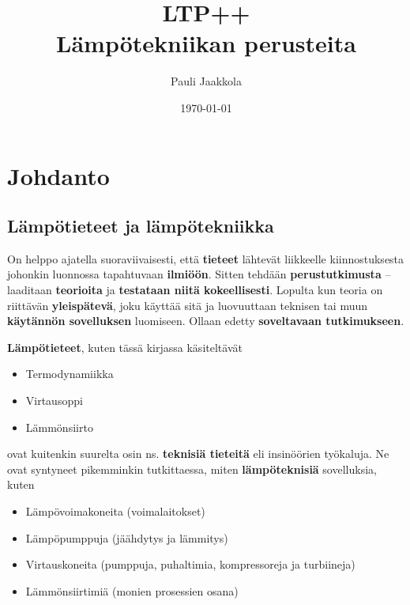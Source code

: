 \documentclass[12pt,a4paper,finnish]{book}
\title{LTP++\\Lämpötekniikan perusteita}
\date{\today}
\author{Pauli Jaakkola}
\begin{document}
\maketitle
\newpage
{}
\setcounter{tocdepth}{3}
\tableofcontents
\newpage
{}
\setcounter{secnumdepth}{3}

\chapter*{Johdanto} %
\renewcommand{\thesection}{\arabic{section}}

\section{Lämpötieteet ja lämpötekniikka} %

On helppo ajatella suoraviivaisesti, että \textbf{tieteet} lähtevät liikkeelle kiinnostuksesta johonkin 
luonnossa tapahtuvaan \textbf{ilmiöön}. 
Sitten tehdään \textbf{perustutkimusta} -- laaditaan \textbf{teorioita} ja \textbf{testataan niitä kokeellisesti}. 
Lopulta kun teoria on riittävän \textbf{yleispätevä}, joku käyttää sitä ja luovuuttaan teknisen tai muun \textbf{käytännön 
sovelluksen} luomiseen. Ollaan edetty \textbf{soveltavaan tutkimukseen}.

\textbf{Lämpötieteet}, kuten tässä kirjassa käsiteltävät

\begin{itemize}
 \item Termodynamiikka
 \item Virtausoppi
 \item Lämmönsiirto
\end{itemize}

ovat kuitenkin suurelta osin ns. \textbf{teknisiä tieteitä} eli insinöörien työkaluja. Ne ovat 
syntyneet pikemminkin tutkittaessa, miten \textbf{lämpöteknisiä} sovelluksia, kuten 

\begin{itemize}
 \item Lämpövoimakoneita (voimalaitokset)
 \item Lämpöpumppuja (jäähdytys ja lämmitys)
 \item Virtauskoneita (pumppuja, puhaltimia, kompressoreja ja turbiineja)
 \item Lämmönsiirtimiä (monien prosessien osana)
\end{itemize}
\end{document}
